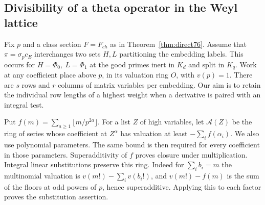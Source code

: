 \documentclass[a4paper,11pt]{article}
\theoremstyle{definition}
\theoremstyle{remark}
\numberwithin{equation}{section}
\begin{document}
\subsection{Divisibility of a theta operator in the Weyl lattice}
\label{sec:rowjetcontent449}

Fix \(p\) and a class section \(F=F_{ch}\) as in
Theorem~\ref{thm:direct76}. Assume that \(\pi=\sigma_pc_E\)
interchanges two sets \(H,L\) partitioning the embedding labels.
This occurs for \(H=\Phi_0,\ L=\Phi_1\) at the good primes inert
in \(K_d\) and split in \(K_q\). Work at any coefficient place
above \(p\), in its valuation ring \(O\), with \(v(p)=1\).
There are \(s\) rows and \(r\) columns of matrix variables per
embedding. Our aim is to retain the individual row lengths of a
highest weight when a derivative is paired with an integral test.

Put \(f(m)=\sum_{a\ge1}\lfloor m/p^{2a}\rfloor\).
For a list \(Z\) of high variables, let \(\mathcal A(Z)\) be the
ring of series whose coefficient at \(Z^\alpha\) has valuation
at least \(-\sum_i f(\alpha_i)\). We also use polynomial
parameters. The same bound is then required for every coefficient
in those parameters. Superadditivity of \(f\) proves closure
under multiplication. Integral linear substitutions preserve this
ring. Indeed for \(\sum_i b_i=m\) the multinomial valuation is
\(v(m!)-\sum_i v(b_i!)\), and \(v(m!)-f(m)\) is the sum of
the floors at odd powers of \(p\), hence superadditive. Applying
this to each factor proves the substitution assertion.
\end{document}
